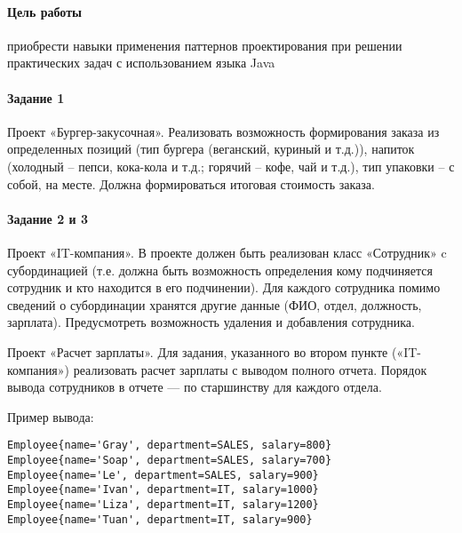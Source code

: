 \newcommand{\basefile}{../../src/ssp_po5/reports/Karnasevich/6/src/main6/}

\paragraph{Цель работы}
приобрести навыки применения паттернов проектирования при решении практических задач с
использованием языка Java


\paragraph{Задание 1}
Проект «Бургер-закусочная». Реализовать возможность формирования заказа из определенных
позиций (тип бургера (веганский, куриный и т.д.)), напиток (холодный – пепси, кока-кола
и т.д.; горячий – кофе, чай и т.д.), тип упаковки – с собой, на месте. Должна формироваться
итоговая стоимость заказа.








\paragraph{Задание 2 и 3}
Проект «IT-компания». В проекте должен быть реализован класс «Сотрудник» c субординацией
(т.е. должна быть возможность определения кому подчиняется сотрудник и кто находится в
его подчинении). Для каждого сотрудника помимо сведений о субординации хранятся другие
данные (ФИО, отдел, должность, зарплата). Предусмотреть возможность удаления и добавления
сотрудника.

Проект «Расчет зарплаты». Для задания, указанного во втором пункте («IT-компания») реализовать
расчет зарплаты с выводом полного отчета. Порядок вывода сотрудников в отчете ---
по старшинству для каждого отдела.





Пример вывода:

\begin{lstlisting}
Employee{name='Gray', department=SALES, salary=800}
Employee{name='Soap', department=SALES, salary=700}
Employee{name='Le', department=SALES, salary=900}
Employee{name='Ivan', department=IT, salary=1000}
Employee{name='Liza', department=IT, salary=1200}
Employee{name='Tuan', department=IT, salary=900}
\end{lstlisting}
